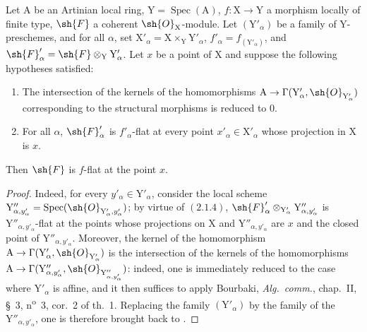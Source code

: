 \begin{corollary}[11.4.13]
\label{IV.11.4.13}
Let $\mathrm{A}$ be an Artinian local ring, $\mathrm{Y}=\operatorname{Spec}(\mathrm{A})$, $f:\mathrm{X}\to\mathrm{Y}$ a
morphism locally of finite type, $\sh{F}$ a coherent $\sh{O}_\mathrm{X}$-module. Let $(\mathrm{Y}'_\alpha)$ be a family of
$\mathrm{Y}$-preschemes, and for all $\alpha$, set $\mathrm{X}'_\alpha=\mathrm{X}\times_\mathrm{Y}\mathrm{Y}'_\alpha$, $f'_\alpha=f_{(\mathrm{Y}'_\alpha)}$, and $\sh{F}'_\alpha=\sh{F}\otimes_\mathrm{Y}\mathrm{Y}'_\alpha$. Let $x$ be a point
of $\mathrm{X}$ and suppose the following hypotheses satisfied:
\begin{enumerate}[label=(\roman*)]
  \item The intersection of the kernels of the homomorphisms $\mathrm{A}\to\Gamma(\mathrm{Y}'_\alpha,\sh{O}_{\mathrm{Y}'_\alpha})$ corresponding to the
  structural morphisms is reduced to $0$.
  \item For all $\alpha$, $\sh{F}'_\alpha$ is $f'_\alpha$-flat at every point $x'_\alpha\in\mathrm{X}'_\alpha$ whose projection in $\mathrm{X}$ is $x$.
\end{enumerate}

Then $\sh{F}$ is $f$-flat at the point $x$.
\end{corollary}

\begin{proof}
Indeed, for every $y'_\alpha\in\mathrm{Y}'_\alpha$, consider the local scheme
$\mathrm{Y}''_{\alpha,y'_\alpha}=\operatorname{Spec}(\sh{O}_{\mathrm{Y}'_\alpha,y'_\alpha})$; by
virtue of $(2.1.4)$, $\sh{F}'_\alpha\otimes_{\mathrm{Y}'_\alpha}\mathrm{Y}''_{\alpha,y'_\alpha}$ is
$\mathrm{Y}''_{\alpha,y'_\alpha}$-flat at the points whose projections on $\mathrm{X}$ and
$\mathrm{Y}''_{\alpha,y'_\alpha}$ are $x$ and the closed point of $\mathrm{Y}''_{\alpha,y'_\alpha}$.
Moreover, the kernel of the homomorphism
$\mathrm{A}\to\Gamma(\mathrm{Y}'_\alpha,\sh{O}_{\mathrm{Y}'_\alpha})$ is the intersection of the kernels of the homomorphisms
$\mathrm{A}\to\Gamma(\mathrm{Y}''_{\alpha,y'_\alpha},\sh{O}_{\mathrm{Y}''_{\alpha,y'_\alpha}})$:
indeed, one is immediately reduced to the case where $\mathrm{Y}'_\alpha$ is affine, and it then suffices to apply Bourbaki, \emph{Alg.\ comm.},
chap.~II, \S~3, n\textsuperscript{o}~3, cor.~2 of th.~1. Replacing the family $(\mathrm{Y}'_\alpha)$ by the family of the $\mathrm{Y}''_{\alpha,y'_\alpha}$,
one is therefore brought back to .
\end{proof}

